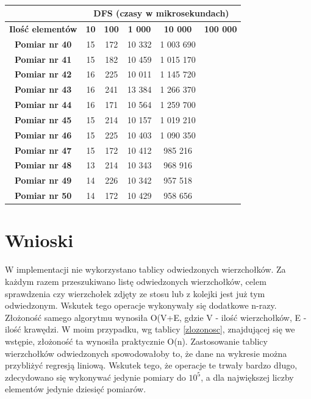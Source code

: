 \documentclass[11pt,a4paper]{article}
\begin{document}
\begin{table}[htbp]
\caption{}
\begin{center}
\begin{tabular}{|c|c|c|c|c|c|}
\hline
\textbf{} & \multicolumn{ 5}{c|}{\textbf{DFS (czasy w mikrosekundach)}} \\ \hline
\textbf{Ilość elementów} & \textbf{10} & \textbf{100} & \textbf{1 000} & \textbf{10 000} & \textbf{100 000} \\ \hline
\textbf{Pomiar nr 40} & 15 & 172 & 10 332 & 1 003 690 &  \\ \hline
\textbf{Pomiar nr 41} & 15 & 182 & 10 459 & 1 015 170 &  \\ \hline
\textbf{Pomiar nr 42} & 16 & 225 & 10 011 & 1 145 720 &  \\ \hline
\textbf{Pomiar nr 43} & 16 & 241 & 13 384 & 1 266 370 &  \\ \hline
\textbf{Pomiar nr 44} & 16 & 171 & 10 564 & 1 259 700 &  \\ \hline
\textbf{Pomiar nr 45} & 15 & 214 & 10 157 & 1 019 210 &  \\ \hline
\textbf{Pomiar nr 46} & 15 & 225 & 10 403 & 1 090 350 &  \\ \hline
\textbf{Pomiar nr 47} & 15 & 172 & 10 412 & 985 216 &  \\ \hline
\textbf{Pomiar nr 48} & 13 & 214 & 10 343 & 968 916 &  \\ \hline
\textbf{Pomiar nr 49} & 14 & 226 & 10 342 & 957 518 &  \\ \hline
\textbf{Pomiar nr 50} & 14 & 172 & 10 429 & 958 656 &  \\ \hline
\end{tabular}
\end{center}
\label{dfs2}
\end{table}


\section{Wnioski}
\hspace{4ex} W implementacji nie wykorzystano tablicy odwiedzonych wierzchołków. Za każdym razem przeszukiwano listę odwiedzonych wierzchołków, celem sprawdzenia czy wierzchołek zdjęty ze stosu lub z kolejki jest już tym odwiedzonym. Wskutek tego operacje wykonywały się dodatkowe n-razy. Złożoność samego algorytmu wynosiła O(V+E, gdzie V - ilość wierzchołków, E - ilość krawędzi. W moim przypadku, wg tablicy \ref{zlozonosc}, znajdującej się we wstępie, złożoność ta wynosiła praktycznie O(n). Zastosowanie tablicy wierzchołków odwiedzonych spowodowałoby to, że dane na wykresie można przybliżyć regresją liniową. Wskutek tego, że operacje te trwały bardzo długo, zdecydowano się wykonywać jedynie pomiary do $10^5$, a dla największej liczby elementów jedynie dziesięć pomiarów.
\end{document}
